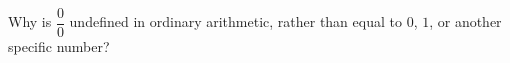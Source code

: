 Why is $\dfrac{0}{0}$ undefined in ordinary arithmetic, rather than equal to $0$, $1$, or another specific number?
